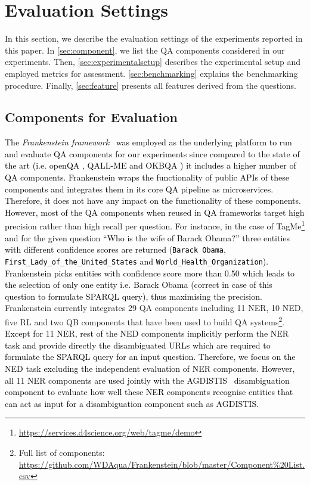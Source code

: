 \documentclass[sigconf,edbt]{acmart-edbt2019}
\newcommand{\qq}[1]{``#1''}
\newcommand{\jlt}[1]{\todo[inline, color=cyan]{JL: #1}}
\begin{document}
\section{Evaluation Settings} \label{sec:setting}
In this section, we describe the evaluation settings of the experiments reported in this paper. In \autoref{sec:component}, we list the QA components considered in our experiments. Then, \autoref{sec:experimentalsetup} describes the experimental setup and employed metrics for assessment. \autoref{sec:benchmarking} explains the benchmarking procedure. Finally, \autoref{sec:feature} presents all features derived from the questions.

\subsection{Components for Evaluation} \label{sec:component}
\textcolor{black}{The \textit{Frankenstein framework}~\cite{DBLP:conf/www/SinghRBSLUVKP0V18} was employed as the underlying platform to run and evaluate QA components for our experiments since compared to the state of the art (i.e. openQA \cite{openqa}, QALL-ME \cite{qallme} and OKBQA \cite{kim2016open}) it includes a higher number of QA components. Frankenstein wraps the functionality of public APIs of these components and integrates them in its core QA pipeline as microservices. Therefore, it does not have any impact on the functionality of these components. However, most of the QA components when reused in QA frameworks target high precision rather than high recall per question. For instance, in the case of TagMe\footnote{\url{https://services.d4science.org/web/tagme/demo}} and for the given question \qq{Who is the wife of Barack Obama?} three entities with different confidence scores are returned (\texttt{Barack Obama}, \texttt{First\_Lady\_of\_the\_United\_States} and \texttt{World\_Health\_Organization}). Frankenstein picks entities with confidence score more than 0.50 which leads to the selection of only one entity i.e. Barack Obama (correct in case of this question to formulate SPARQL query), thus maximising the precision.}
Frankenstein currently integrates 29 QA components including 11 NER, 10 NED, five RL and two QB components that have been used to build QA systems\footnote{Full list of components: \url{https://github.com/WDAqua/Frankenstein/blob/master/Component\%20List.csv}}. \textcolor{black}{Except for 11 NER, rest of the NED components implicitly perform the NER task and provide directly the disambiguated URLs which are required to formulate the SPARQL query for an input question. Therefore, we focus on the NED task excluding the independent evaluation of NER components. However, all 11 NER components are used jointly with the AGDISTIS~\cite{UsbeckNRGCAB14} disambiguation component to evaluate how well these NER components recognise entities that can act as input for a disambiguation component such as AGDISTIS.}
\end{document}
